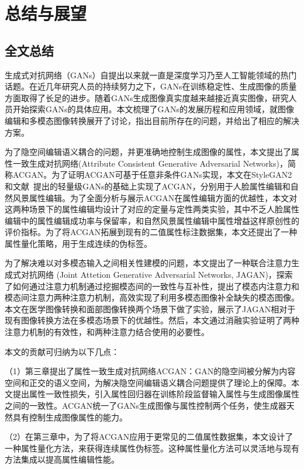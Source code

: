 \chapter{总结与展望}

\section{全文总结}

生成式对抗网络（GANs）自提出以来就一直是深度学习乃至人工智能领域的热门话题。在近几年研究人员的持续努力之下，GANs在训练稳定性、生成图像的质量方面取得了长足的进步。随着GANs生成图像真实度越来越接近真实图像，研究人员开始探索GANs的具体应用。本文梳理了GANs的发展历程和应用领域，就图像编辑和多模态图像转换展开了讨论，指出目前所存在的问题，并给出了相应的解决方案。

为了隐空间编辑语义耦合的问题，并更准确地控制生成图像的属性，本文提出了属性一致生成对抗网络(Attribute Consistent Generative Adversarial Networks)，简称ACGAN。为了证明ACGAN可基于任意非条件GANs实现，本文在StyleGAN2和文献~\cite{lwgan}提出的轻量级GANs的基础上实现了ACGAN，分别用于人脸属性编辑和自然风景属性编辑。为了全面分析与展示ACGAN在属性编辑方面的优越性，本文对这两种场景下的属性编辑均设计了对应的定量与定性两类实验，其中不乏人脸属性编辑中的属性编辑成功率与保留率，和自然风景属性编辑中属性增益这样原创性的评价指标。为了将ACGAN拓展到现有的二值属性标注数据集，本文还提出了一种属性量化策略，用于生成连续的伪标签。

为了解决难以对多模态输入之间相关性建模的问题，本文提出了一种联合注意力生成式对抗网络 (Joint Attetion Generative Adversarial Networks, JAGAN)，探索了如何通过注意力机制通过挖掘模态间的一致性与互补性，提出了模态内注意力和模态间注意力两种注意力机制，高效实现了利用多模态图像补全缺失的模态图像。本文在医学图像转换和面部图像转换两个场景下做了实验，展示了JAGAN相对于现有图像转换方法在多模态场景下的优越性。然后，本文通过消融实验证明了两种注意力机制的有效性，和两种注意力结合使用的必要性。

本文的贡献可归纳为以下几点：

（1）第三章提出了属性一致生成对抗网络ACGAN：GAN的隐空间被分解为内容空间和正交的语义空间，为解决隐空间编辑语义耦合问题提供了理论上的保障。本文提出属性一致性损失，引入属性回归器在训练阶段监督输入属性与生成图像属性之间的一致性。ACGAN统一了GANs生成图像与属性控制两个任务，使生成器天然具有控制生成图像属性的能力。

（2）在第三章中，为了将ACGAN应用于更常见的二值属性数据集，本文设计了一种属性量化方法，来获得连续属性伪标签。这种属性量化方法可以灵活地与现有方法集成以提高属性编辑性能。

